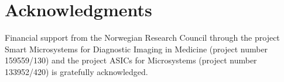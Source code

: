 \section*{Acknowledgments}
{\small Financial support from the Norwegian Research Council through the
project Smart Microsystems for Diagnostic Imaging in Medicine (project
number 159559/130) and the project ASICs for Microsystems (project
number 133952/420) is gratefully acknowledged. }



